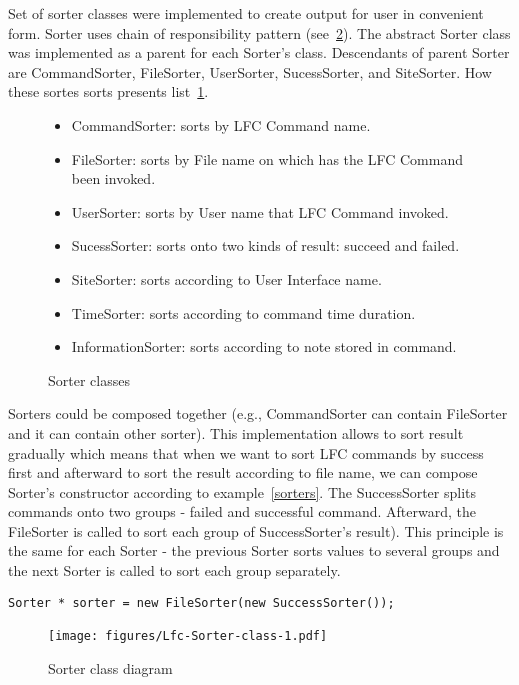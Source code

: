 \documentclass[a4paper, 11pt]{article} %
\begin{document}
Set of sorter classes were implemented to create output for user in convenient form. Sorter uses chain of responsibility pattern (see~\ref{fig:sorters}). The abstract Sorter class was implemented as a parent for each Sorter's class. Descendants of parent Sorter are CommandSorter, FileSorter, UserSorter, SucessSorter, and SiteSorter. How these sortes sorts presents list~\ref{enum:sorters}.

\begin{figure}[H]
  \centering
\begin{itemize}
\item CommandSorter: sorts by LFC Command name.
\item FileSorter: sorts by File name on which has the LFC Command been invoked.
\item UserSorter: sorts by User name that LFC Command invoked.
\item SucessSorter: sorts onto two kinds of result: succeed and failed.
\item SiteSorter: sorts according to User Interface name.
\item TimeSorter: sorts according to command time duration.
\item InformationSorter: sorts according to note stored in command.
\end{itemize}
\caption{Sorter classes}
\label{enum:sorters}
\end{figure}

Sorters could be composed together (e.g., CommandSorter can contain FileSorter and it can contain other sorter). This implementation allows to sort result gradually which means that when we want to sort LFC commands by success first and afterward to sort the result according to file name, we can compose Sorter's constructor according to example~\ref{sorters}. The SuccessSorter splits commands onto two groups - failed and successful command. Afterward, the FileSorter is called to sort each group of SuccessSorter's result). This principle is the same for each Sorter - the previous Sorter sorts values to several groups and the next Sorter is called to sort each group separately.

\begin{center}
\begin{lstlisting}[style=cli, label={sorters}, caption={Composed sorters}]
Sorter * sorter = new FileSorter(new SuccessSorter());
\end{lstlisting}
\end{center}

\begin{figure}[H]
  \centering
    \texttt{[image: figures/Lfc-Sorter-class-1.pdf]}\
    \caption{Sorter class diagram}
    \label{fig:sorters}
\end{figure}
\end{document}

